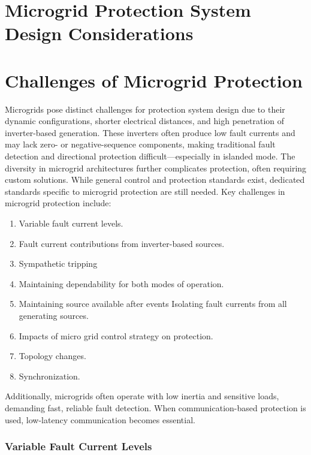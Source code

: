 \section{Microgrid Protection System Design Considerations}








\section{Challenges of Microgrid Protection}

Microgrids pose distinct challenges for protection system design due to their dynamic configurations, shorter electrical distances, and high penetration of inverter-based generation. These inverters often produce low fault currents and may lack zero- or negative-sequence components, making traditional fault detection and directional protection difficult—especially in islanded mode.
The diversity in microgrid architectures further complicates protection, often requiring custom solutions. While general control and protection standards exist, dedicated standards specific to microgrid protection are still needed.
Key challenges in microgrid protection include:

\begin{enumerate}
	\item Variable fault current levels.
	\item Fault current contributions from inverter-based sources.
\item Sympathetic tripping
 \item Maintaining dependability for both modes of operation.
\item Maintaining source available after events Isolating fault currents
	 from all generating sources.
\item Impacts of micro grid control strategy on protection.
\item Topology changes.
\item Synchronization. 

\end{enumerate}

Additionally, microgrids often operate with low inertia and sensitive loads, demanding fast, reliable fault detection. When communication-based protection is used, low-latency communication becomes essential.


\subsubsection{Variable Fault Current Levels}

